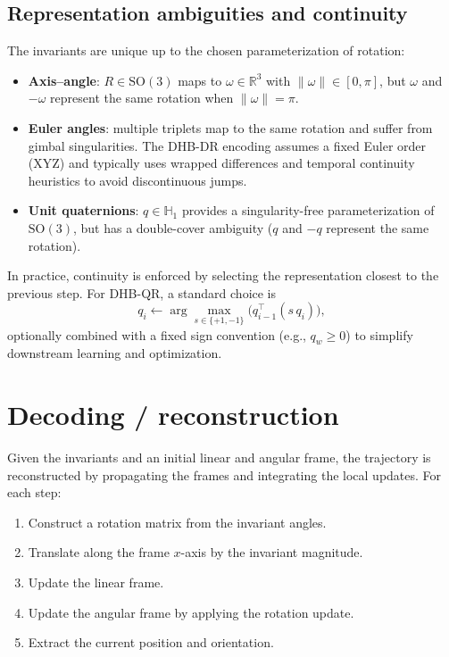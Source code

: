 \documentclass[11pt]{article}
\begin{document}
\subsection{Representation ambiguities and continuity}\label{sec:rep-ambig}
The invariants are unique up to the chosen parameterization of rotation:
\begin{itemize}
  \item \textbf{Axis--angle}: $R \in \mathrm{SO}(3)$ maps to $\omega \in \mathbb{R}^3$ with $\lVert \omega\rVert \in [0,\pi]$, but $\omega$ and $-\omega$ represent the same rotation when $\lVert \omega\rVert = \pi$.
  \item \textbf{Euler angles}: multiple triplets map to the same rotation and suffer from gimbal singularities. The DHB-DR encoding assumes a fixed Euler order (XYZ) and typically uses wrapped differences and temporal continuity heuristics to avoid discontinuous jumps.
  \item \textbf{Unit quaternions}: $q \in \mathbb{H}_1$ provides a singularity-free parameterization of $\mathrm{SO}(3)$, but has a double-cover ambiguity ($q$ and $-q$ represent the same rotation).
\end{itemize}
In practice, continuity is enforced by selecting the representation closest to the previous step. For DHB-QR, a standard choice is
\begin{equation}
  q_i \leftarrow \arg\max_{s\in\{+1,-1\}} \bigl( q_{i-1}^\top (s\,q_i) \bigr),
\end{equation}
optionally combined with a fixed sign convention (e.g., $q_w\ge 0$) to simplify downstream learning and optimization.

\section{Decoding / reconstruction}
Given the invariants and an initial linear and angular frame, the trajectory is reconstructed by propagating the frames and integrating the local updates. For each step:
\begin{enumerate}
  \item Construct a rotation matrix from the invariant angles.
  \item Translate along the frame $x$-axis by the invariant magnitude.
  \item Update the linear frame.
  \item Update the angular frame by applying the rotation update.
  \item Extract the current position and orientation.
\end{enumerate}
\end{document}
